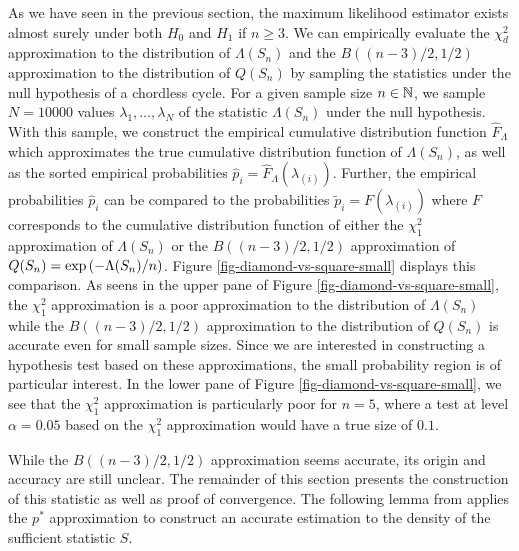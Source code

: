 As we have seen in the previous section, the maximum likelihood estimator exists almost surely under both $H_0$ and $H_1$ if $n \geq 3$. We can empirically evaluate the $\chi^2_d$ approximation to the distribution of $\Lambda(S_n)$ and the $B((n - 3)/2, 1/2)$ approximation to the distribution of $Q(S_n)$ by sampling the statistics under the null hypothesis of a chordless cycle. For a given sample size $n \in \mathbb{N}$, we sample $N = 10000$ values $\lambda_1, \ldots, \lambda_N$ of the statistic $\Lambda(S_n)$ under the null hypothesis. With this sample, we construct the empirical cumulative distribution function $\hat F_\Lambda$ which approximates the true cumulative distribution function of $\Lambda(S_n)$, as well as the sorted empirical probabilities $\hat p_{i} = \hat F_\Lambda(\lambda_{(i)})$. Further, the empirical probabilities $\hat p_{i}$ can be compared to the probabilities $\tilde p_i = F(\lambda_{(i)})$ where $F$ corresponds to the cumulative distribution function of either the $\chi^2_1$ approximation of $\Lambda(S_n)$ or the $B((n - 3)/2, 1/2)$ approximation of $Q(S_n) = \exp\left(-\Lambda(S_n) / n\right)$. Figure \ref{fig-diamond-vs-square-small} displays this comparison. As seens in the upper pane of Figure \ref{fig-diamond-vs-square-small}, the $\chi^2_1$ approximation is a poor approximation to the distribution of $\Lambda(S_n)$ while the $B((n - 3)/2, 1/2)$ approximation to the distribution of $Q(S_n)$ is accurate even for small sample sizes. Since we are interested in constructing a hypothesis test based on these approximations, the small probability region is of particular interest. In the lower pane of Figure \ref{fig-diamond-vs-square-small}, we see that the $\chi^2_1$ approximation is particularly poor for $n=5$, where a test at level $\alpha=0.05$ based on the $\chi^2_1$ approximation would have a true size of $0.1$.



While the $B((n - 3)/2, 1/2)$ approximation seems accurate, its origin and accuracy are still unclear. The remainder of this section presents the construction of this statistic as well as proof of convergence. The following lemma from \cite[Theorem 3.1]{eriksen1996tests} applies the $p^*$ approximation to construct an accurate estimation to the density of the sufficient statistic $S$.

